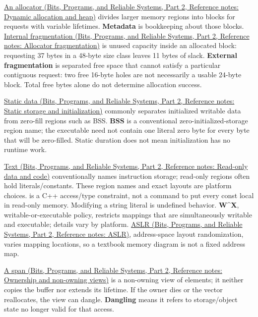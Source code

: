 \href{../01-Bits-Programs-and-Reliable-Systems-P02/main.pdf\#nameddest=appendix-c3480f7d9ff3}{An allocator (Bits, Programs, and Reliable Systems, Part 2, Reference notes: Dynamic allocation and heap)} divides larger memory regions into blocks for requests with variable lifetimes. \textbf{Metadata} is bookkeeping about those blocks. \href{../01-Bits-Programs-and-Reliable-Systems-P02/main.pdf\#nameddest=appendix-a7c50686d81f}{Internal fragmentation (Bits, Programs, and Reliable Systems, Part 2, Reference notes: Allocator fragmentation)} is unused capacity inside an allocated block: requesting 37 bytes in a 48-byte size class leaves 11 bytes of slack. \textbf{External fragmentation} is separated free space that cannot satisfy a particular contiguous request: two free 16-byte holes are not necessarily a usable 24-byte block. Total free bytes alone do not determine allocation success.

\href{../01-Bits-Programs-and-Reliable-Systems-P02/main.pdf\#nameddest=appendix-17c93c4c2f19}{Static data (Bits, Programs, and Reliable Systems, Part 2, Reference notes: Static storage and initialization)} commonly separates initialized writable data from zero-fill regions such as BSS. \textbf{BSS} is a conventional zero-initialized-storage region name; the executable need not contain one literal zero byte for every byte that will be zero-filled. Static duration does not mean initialization has no runtime work.

\href{../01-Bits-Programs-and-Reliable-Systems-P02/main.pdf\#nameddest=appendix-5f9e5e2f0a5e}{Text (Bits, Programs, and Reliable Systems, Part 2, Reference notes: Read-only data and code)} conventionally names instruction storage; read-only regions often hold literals/constants. These region names and exact layouts are platform choices.  is a C++ access/type constraint, not a command to put every const local in read-only memory. Modifying a string literal is undefined behavior. \textbf{W\^{}X}, writable-or-executable policy, restricts mappings that are simultaneously writable and executable; details vary by platform. \href{../01-Bits-Programs-and-Reliable-Systems-P02/main.pdf\#nameddest=appendix-78cb248c8355}{ASLR (Bits, Programs, and Reliable Systems, Part 2, Reference notes: ASLR)}, address-space layout randomization, varies mapping locations, so a textbook memory diagram is not a fixed address map.

\href{../01-Bits-Programs-and-Reliable-Systems-P02/main.pdf\#nameddest=appendix-d52e4486f527}{A span (Bits, Programs, and Reliable Systems, Part 2, Reference notes: Ownership and non-owning views)} is a non-owning view of elements; it neither copies the buffer nor extends its lifetime. If the owner dies or the vector reallocates, the view can dangle. \textbf{Dangling} means it refers to storage/object state no longer valid for that access.

